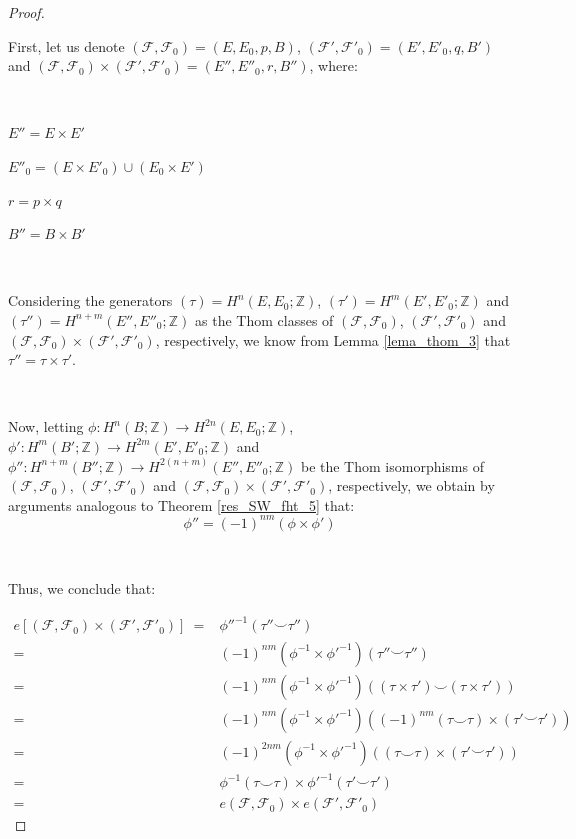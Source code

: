 \documentclass[12pt,oneside]{book}
\newcommand{\Z}{\mathbb{Z}}
\newcommand{\ccup}{\smile}
\begin{document}
    \begin{proof}

        \

    	First, let us denote $(\mathcal{F},\mathcal{F}_{0})=(E,E_{0},p,B)$, $(\mathcal{F'},\mathcal{F'}_{0})=(E',E'_{0},q,B')$ and 
        $(\mathcal{F},\mathcal{F}_{0})\times (\mathcal{F'},\mathcal{F'}_{0})=(E'',E''_{0},r,B'')$, where:

        \

    	$E''=E\times E'$

    	$E''_{0}=(E\times E'_{0})\cup (E_{0}\times E')$

    	$r=p\times q$

    	$B''=B\times B'$
        
        \

    	Considering the generators $(\tau)=H^{n}(E,E_{0};\Z)$, $(\tau')=H^{m}(E',E'_{0};\Z)$ and $(\tau'')=H^{n+m}(E'',E''_{0};\Z)$ as the 
        Thom classes of $(\mathcal{F},\mathcal{F}_{0})$, $(\mathcal{F'},\mathcal{F'}_{0})$ and 
        $(\mathcal{F},\mathcal{F}_{0})\times (\mathcal{F'},\mathcal{F'}_{0})$, respectively, we know from Lemma \ref{lema_thom_3} that 
        $\tau''=\tau\times\tau'$.

        \

    	Now, letting $\phi:H^{n}(B;\Z)\to H^{2n}(E,E_{0};\Z)$, $\phi':H^{m}(B';\Z)\to H^{2m}(E',E'_{0};\Z)$ and $\phi'':H^{n+m}(B'';\Z)\to H^{2(n+m)}(E'',E''_{0};\Z)$ be the Thom isomorphisms of $(\mathcal{F},\mathcal{F}_{0})$, $(\mathcal{F'},\mathcal{F'}_{0})$ and $(\mathcal{F},\mathcal{F}_{0})\times (\mathcal{F'},\mathcal{F'}_{0})$, respectively, we obtain by arguments analogous to Theorem \ref{res_SW_fht_5} that:
    	$$ \phi''=(-1)^{nm}(\phi\times\phi') $$

        \

    	Thus, we conclude that:

    	$\begin{array}{rl}
    		e\left[ (\mathcal{F},\mathcal{F}_{0})\times (\mathcal{F'},\mathcal{F'}_{0}) \right] \ = & \phi''^{-1}(\tau''\ccup\tau'') \\
    		= & (-1)^{nm}(\phi^{-1}\times\phi'^{-1})\left( \tau''\ccup\tau'' \right) \\
    		= & (-1)^{nm}(\phi^{-1}\times\phi'^{-1})\left( (\tau\times\tau')\ccup (\tau\times\tau') \right) \\
    		= & (-1)^{nm}(\phi^{-1}\times\phi'^{-1})\left( (-1)^{nm}(\tau\ccup\tau)\times (\tau'\ccup\tau') \right) \\
    		= & (-1)^{2nm}(\phi^{-1}\times\phi'^{-1})\left( (\tau\ccup\tau)\times (\tau'\ccup\tau') \right) \\
    		= & \phi^{-1}(\tau\ccup\tau)\times\phi'^{-1}(\tau'\ccup\tau') \\
    		= & e(\mathcal{F},\mathcal{F}_{0})\times e(\mathcal{F'},\mathcal{F'}_{0})
    	\end{array}$

    \end{proof}
\end{document}
